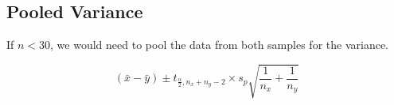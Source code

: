 \documentclass{article}
\theoremstyle{mytheoremstyle}
\theoremstyle{mytheoremstyle}
\theoremstyle{myproblemstyle}
\begin{document}
    \subsection{Pooled Variance}

    If $n < 30$, we would need to pool the data from both samples for the variance. 

    \begin{definition}

        \[(\bar{x} - \bar{y}) \pm t_{\frac{\alpha}{2}, n_x + n_y - 2} \times s_p \sqrt{\frac{1}{n_x} + \frac{1}{n_y}}\]
        
    \end{definition}

    
\end{document}
